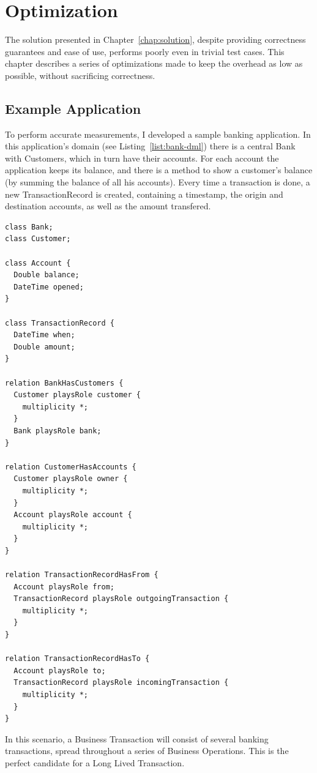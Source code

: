 \chapter{Optimization}

The solution presented in Chapter~\ref{chap:solution}, despite
providing correctness guarantees and ease of use, performs poorly even
in trivial test cases. This chapter describes a series of
optimizations made to keep the overhead as low as possible, without
sacrificing correctness.

\section{Example Application}

To perform accurate measurements, I developed a sample banking
application. In this application's domain (see
Listing~\ref{list:bank-dml}) there is a central Bank with Customers,
which in turn have their accounts. For each account the application
keeps its balance, and there is a method to show a
customer's balance (by summing the balance of all his accounts). Every
time a transaction is done, a new TransactionRecord is created,
containing a timestamp, the origin and destination accounts, as well
as the amount transfered.

\begin{lstlisting}[caption={Domain Model for the Banking Application},
  label={list:bank-dml},float]
class Bank;
class Customer;

class Account {
  Double balance;
  DateTime opened;
}

class TransactionRecord {
  DateTime when;
  Double amount;
}

relation BankHasCustomers {
  Customer playsRole customer {
    multiplicity *;
  }
  Bank playsRole bank;
}

relation CustomerHasAccounts {
  Customer playsRole owner {
    multiplicity *;
  }
  Account playsRole account {
    multiplicity *;
  }
}

relation TransactionRecordHasFrom {
  Account playsRole from;
  TransactionRecord playsRole outgoingTransaction {
    multiplicity *;
  }
}

relation TransactionRecordHasTo {
  Account playsRole to;
  TransactionRecord playsRole incomingTransaction {
    multiplicity *;
  }
}
\end{lstlisting}

In this scenario, a Business Transaction will consist of several
banking transactions, spread throughout a series of Business
Operations. This is the perfect candidate for a Long Lived
Transaction.

